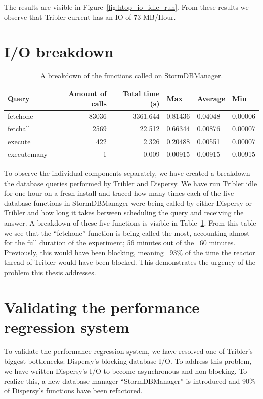 The results are visible in Figure~\ref{fig:htop_io_idle_run}. 
From these results we observe that Tribler current has an IO of 73 MB/Hour.

\section{I/O breakdown}

\begin{table}[]
	\centering
	\caption{A breakdown of the functions called on StormDBManager.}
	\label{table:breakdown_tribler_idle}
	\begin{tabular}{|l|r|r|l|l|l|}
		\hline
	\textbf{Query}	& \textbf{Amount of calls} & \textbf{Total time (s)} & \textbf{Max}  & \textbf{Average} & \textbf{Min} \\ \hline
	fetchone	& 83036	& 3361.644 	& 0.81436	& 0.04048	& 0.00006 \\ \hline
	fetchall	& 2569	& 22.512	& 0.66344	& 0.00876	& 0.00007 \\ \hline
	execute		& 422	& 2.326  	& 0.20488	& 0.00551	& 0.00007 \\ \hline
	executemany	& 1		& 0.009 	& 0.00915 	& 0.00915	& 0.00915 \\ \hline
	\end{tabular}
\end{table}

To observe the individual components separately, we have created a breakdown the database queries performed by Tribler and Dispersy.
We have run Tribler idle for one hour on a fresh install and traced how many times each of the five database functions in StormDBManager were being called by either Dispersy or Tribler and how long it takes between scheduling the query and receiving the answer.
A breakdown of these five functions is visible in Table~\ref{table:breakdown_tribler_idle}.
From this table we see that the \enquote{fetchone} function is being called the most, accounting almost for the full duration of the experiment; 56 minutes out of the ~60 minutes.
Previously, this would have been blocking, meaning ~93\% of the time the reactor thread of Tribler would have been blocked.
This demonstrates the urgency of the problem this thesis addresses. 

\section{Validating the performance regression system}

To validate the performance regression system, we have resolved one of Tribler's biggest bottlenecks: Dispersy's blocking database I/O.
To address this problem, we have written Dispersy's I/O to become asynchronous and non-blocking.
To realize this, a new database manager \enquote{StormDBManager} is introduced and 90\% of Dispersy's functions have been refactored.

